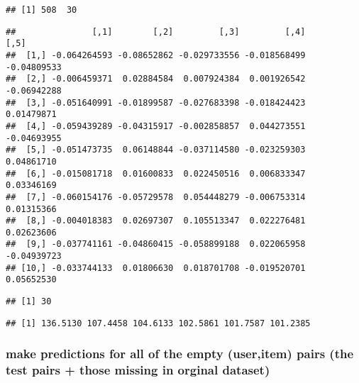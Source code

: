 \documentclass[]{article}
\newenvironment{Shaded}{\begin{snugshade}}{\end{snugshade}}
\newcommand{\CommentTok}[1]{\textcolor[rgb]{0.56,0.35,0.01}{\textit{#1}}}
\newcommand{\DecValTok}[1]{\textcolor[rgb]{0.00,0.00,0.81}{#1}}
\newcommand{\KeywordTok}[1]{\textcolor[rgb]{0.13,0.29,0.53}{\textbf{#1}}}
\newcommand{\NormalTok}[1]{#1}
\newcommand{\OperatorTok}[1]{\textcolor[rgb]{0.81,0.36,0.00}{\textbf{#1}}}
\begin{document}
\begin{Shaded}
\end{Shaded}

\begin{verbatim}
## [1] 508  30
\end{verbatim}

\begin{verbatim}
##               [,1]        [,2]         [,3]         [,4]        [,5]
##  [1,] -0.064264593 -0.08652862 -0.029733556 -0.018568499 -0.04809533
##  [2,] -0.006459371  0.02884584  0.007924384  0.001926542 -0.06942288
##  [3,] -0.051640991 -0.01899587 -0.027683398 -0.018424423  0.01479871
##  [4,] -0.059439289 -0.04315917 -0.002858857  0.044273551 -0.04693955
##  [5,] -0.051473735  0.06148844 -0.037114580 -0.023259303  0.04861710
##  [6,] -0.015081718  0.01600833  0.022450516  0.006833347  0.03346169
##  [7,] -0.060154176 -0.05729578  0.054448279 -0.006753314  0.01315366
##  [8,] -0.004018383  0.02697307  0.105513347  0.022276481  0.02623606
##  [9,] -0.037741161 -0.04860415 -0.058899188  0.022065958 -0.04939723
## [10,] -0.033744133  0.01806630  0.018701708 -0.019520701  0.05652530
\end{verbatim}

\begin{Shaded}
\end{Shaded}

\begin{verbatim}
## [1] 30
\end{verbatim}

\begin{verbatim}
## [1] 136.5130 107.4458 104.6133 102.5861 101.7587 101.2385
\end{verbatim}

\hypertarget{make-predictions-for-all-of-the-empty-useritem-pairs-the-test-pairs-those-missing-in-orginal-dataset}{%
\subsubsection{make predictions for all of the empty (user,item) pairs
(the test pairs + those missing in orginal
dataset)}\label{make-predictions-for-all-of-the-empty-useritem-pairs-the-test-pairs-those-missing-in-orginal-dataset}}
\end{document}
